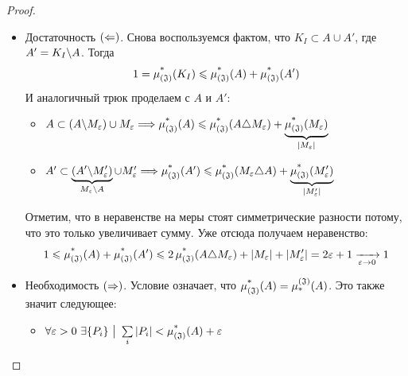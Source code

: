 \begin{proof}~
	\begin{itemize}
		\item Достаточность $(\La)$. Снова воспользуемся фактом, что $K_I \subset A \cup A'$, где $A' = K_I \bs A$. Тогда
		\[
			1 = \upjlm(K_I) \le \upjlm(A) + \upjlm(A')
		\]
		И аналогичный трюк проделаем с $A$ и $A'$:
		\begin{itemize}
			\item \(A \subset (A \bs M_\eps) \cup M_\eps \Longrightarrow \upjlm(A) \le \upjlm(A \tr M_\eps) + \underbrace{\upjlm(M_\eps)}_{|M_\eps|}\)
			
			\item \(A' \subset \underbrace{(A' \bs M'_\eps)}_{M_\eps \bs A} \cup M'_\eps \Longrightarrow \upjlm(A') \le \upjlm(M_\eps \tr A) + \underbrace{\upjlm(M'_\eps)}_{|M'_\eps|}\)
		\end{itemize}
		Отметим, что в неравенстве на меры стоят симметрические разности потому, что это только увеличивает сумму. Уже отсюда получаем неравенство:
		\[
			1 \le \upjlm(A) + \upjlm(A') \le 2\upjlm(A \tr M_\eps) + |M_\eps| + |M'_\eps| = 2\eps + 1 \xrightarrow[\eps \to 0]{} 1
		\]
		
		\item Необходимость $(\Ra)$. Условие означает, что $\upjlm(A) = \downjlm(A)$. Это также значит следующее:
		\begin{itemize}
			\item \(\forall \eps > 0\ \exists \{P_i\} \such \suml_i |P_i| < \upjlm(A) + \eps\)
			

\end{itemize}
\end{itemize}
\end{proof}
